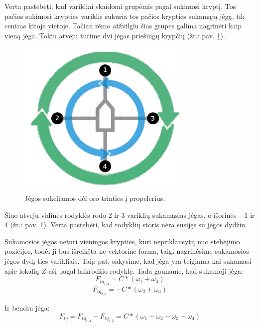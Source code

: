 \documentclass[12pt, a4paper, lithuanian, final]{article}
\begin{document}
Verta pastebėti, kad varikliai skaidomi grupėmis pagal sukimosi kryptį. Tos pačios sukimosi krypties variklis sukuria tos pačios krypties sukamąją jėgą, tik centras kitoje vietoje. Tačiau rėmo atžvilgiu šias grupes galima nagrinėti kaip vieną jėga.
Tokiu atveju turime dvi jėgas priešingų krypčių (žr.: pav. \ref{pav-grouped-forces}).

\begin{figure}[H]
\begin{center}
\includegraphics[width=0.75\textwidth]{img/quadcopter-torque-grouped.png}
\caption{Jėgos sukeliamos dėl oro trinties į propelerius.}
\label{pav-grouped-forces}
\end{center}
\end{figure}

Šiuo atveju vidinės rodyklės rodo 2 ir 3 variklių sukamąsias jėgas, o išorinės -- 1 ir 4 (žr.: pav. \ref{pav-grouped-forces}).
Verta pastebėti, kad rodyklių storis nėra susijęs su jėgos dydžiu.

Sukamosios jėgos neturi vieningos krypties, kuri nepriklausytų nuo stebėjimo pozicijos, todėl ji bus išreikšta ne vektorine forma, taigi nagrinėsime sukamosios jėgos dydį ties varikliais.
Taip pat, sakysime, kad jėga yra teigiama kai sukamasi apie lokalią $Z$ ašį pagal laikrodžio rodyklę.
Tada gauname, kad sukamoji jėga:
\begin{equation}
	F_{tq_{1,4}} = C * (\omega_{1} + \omega_{4})
\end{equation}
\begin{equation}
	F_{tq_{2,3}} = -C * (\omega_{2} + \omega_{3})
\end{equation}

Ir bendra jėga:
\begin{equation}
	F_{tq} = F_{tq_{1,4}} - F_{tq_{2,3}} = C * (\omega_{1} - \omega_{2} - \omega_{3} + \omega_{4})
\end{equation}
\end{document}
